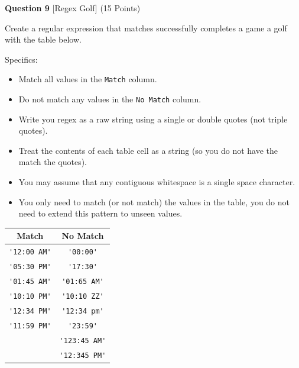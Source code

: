 \documentclass{report}
\begin{document}




\vspace{1.0cm}




\begin{minipage}{\textwidth}
    \noindent
        \textbf{Question 9} [Regex Golf] (15 Points)
    \vspace{0.25cm}

    \noindent
    Create a regular expression that matches successfully completes a game a golf with the table below.

Specifics:

\begin{itemize}
    \item Match all values in the \verb|Match| column.
    \item Do not match any values in the \verb|No Match| column.
    \item Write you regex as a raw string using a single or double quotes (not triple quotes).
    \item Treat the contents of each table cell as a string (so you do not have the match the quotes).
    \item You may assume that any contiguous whitespace is a single space character.
    \item You only need to match (or not match) the values in the table, you do not need to extend this pattern to unseen values.
\end{itemize}

\begingroup
\setlength{\tabcolsep}{1.50em}
\begingroup
\renewcommand{\arraystretch}{1.50}
\begin{tabular}{ cc }
\textbf{Match} & \textbf{No Match} \\
\hline
\verb|'12:00 AM'| & \verb|'00:00'| \\
\verb|'05:30 PM'| & \verb|'17:30'| \\
\verb|'01:45 AM'| & \verb|'01:65 AM'| \\
\verb|'10:10 PM'| & \verb|'10:10 ZZ'| \\
\verb|'12:34 PM'| & \verb|'12:34 pm'| \\
\verb|'11:59 PM'| & \verb|'23:59'| \\
 & \verb|'123:45 AM'| \\
 & \verb|'12:345 PM'| \\
\end{tabular}
\endgroup
\endgroup


\end{minipage}
\end{document}
